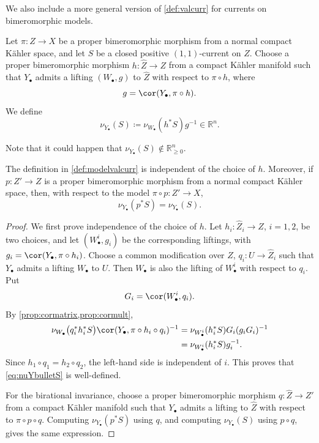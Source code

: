 We also include a more general version of \cref{def:valcurr} for currents on bimeromorphic models.
\begin{definition}\label{def:modelvalcurr}
    Let $\pi\colon Z\rightarrow X$ be a proper bimeromorphic morphism from a normal compact Kähler space, and let $S$ be a closed positive $(1,1)$-current on $Z$. Choose a proper bimeromorphic morphism
    $h\colon \widehat Z\rightarrow Z$ from a compact Kähler manifold such that
    $Y_{\bullet}$ admits a lifting $(W_{\bullet},g)$ to $\widehat Z$ with
    respect to $\pi\circ h$, where
    \[
        g=\cor(Y_{\bullet},\pi\circ h).
    \]
    We define
    \begin{equation}\label{eq:nuYbulletS}
        \nu_{Y_{\bullet}}(S)\coloneqq \nu_{W_{\bullet}}(h^*S)g^{-1}\in \mathbb{R}^n.
    \end{equation}
\end{definition}
Note that it could happen that $\nu_{Y_{\bullet}}(S)\notin \mathbb{R}_{\geq 0}^n$.

\begin{lemma}\label{lma:modelvalcurrbir}
    The definition in \cref{def:modelvalcurr} is independent of the choice of $h$. Moreover, if $p\colon Z'\rightarrow Z$ is a proper bimeromorphic morphism from a normal compact Kähler space, then, with respect to the model $\pi\circ p\colon Z'\rightarrow X$,
    \[
        \nu_{Y_{\bullet}}(p^*S)=\nu_{Y_{\bullet}}(S).
    \]
\end{lemma}
\begin{proof}
    We first prove independence of the choice of $h$. Let $h_i\colon \widehat Z_i\rightarrow Z$, $i=1,2$, be two choices, and let $(W^i_{\bullet},g_i)$ be the corresponding liftings, with $g_i=\cor(Y_{\bullet},\pi\circ h_i)$. Choose a common modification over $Z$, $q_i\colon U\rightarrow \widehat Z_i$ such that $Y_{\bullet}$ admits a lifting $W_{\bullet}$ to $U$. Then $W_{\bullet}$ is also the lifting of $W^i_{\bullet}$ with respect to $q_i$. Put
    \[
        G_i=\cor(W^i_{\bullet},q_i).
    \]
    By \cref{prop:cormatrix,prop:cormult},
    \[
    \begin{aligned}
        \nu_{W_{\bullet}}\bigl(q_i^*h_i^*S\bigr)
        \cor(Y_{\bullet},\pi\circ h_i\circ q_i)^{-1}
        &=
        \nu_{W^i_{\bullet}}(h_i^*S)G_i(g_iG_i)^{-1}  \\
        &=
        \nu_{W^i_{\bullet}}(h_i^*S)g_i^{-1}.
    \end{aligned}
    \]
    Since $h_1\circ q_1=h_2\circ q_2$, the left-hand side is independent of $i$. This proves that \eqref{eq:nuYbulletS} is well-defined.

    For the birational invariance, choose a proper bimeromorphic morphism $q\colon \widehat Z\rightarrow Z'$ from a compact Kähler manifold such that $Y_{\bullet}$ admits a lifting to $\widehat Z$ with respect to $\pi\circ p\circ q$. Computing $\nu_{Y_{\bullet}}(p^*S)$ using $q$, and computing $\nu_{Y_{\bullet}}(S)$ using $p\circ q$, gives the same expression.
\end{proof}

